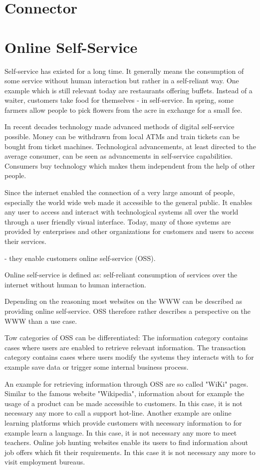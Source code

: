 \documentclass[
     12pt,         %
     a4paper,      %
     BCOR=10mm,version=first,     %
     DIV=14,version=first,        %
     ]{scrreprt}
\begin{document}
\section{Connector}

\section{Online Self-Service}
Self-service has existed for a long time. It generally means the consumption of some service without human interaction but rather in a self-reliant way. One example which is still relevant today are restaurants offering buffets. Instead of a waiter, customers take food for themselves - in self-service. In spring, some farmers allow people to pick flowers from the acre in exchange for a small fee.

In recent decades technology made advanced methods of digital self-service possible. Money can be withdrawn from local ATMs and train tickets can be bought from ticket machines. Technological advancements, at least directed to the average consumer, can be seen as advancements in self-service capabilities. Consumers buy technology which makes them independent from the help of other people. 

Since the internet enabled the connection of a very large amount of people, especially the world wide web made it accessible to the general public. It enables any user to access and interact with technological systems all over the world through a user friendly visual interface. Today, many of those systems are provided by enterprises and other organizations for customers and users to access their services. 

- they enable customers online self-service (OSS).

Online self-service is defined as: self-reliant consumption of services over the internet without human to human interaction.

Depending on the reasoning most websites on the WWW can be described as providing online self-service. OSS therefore rather describes a perspective on the WWW than a use case.

Tow categories of OSS can be differentiated: The information category contains cases where users are enabled to retrieve relevant information. The transaction category contains cases where users modify the systems they interacts with to for example save data or trigger some internal business process.

An example for retrieving information through OSS are so called "WiKi" pages. Similar to the famous website "Wikipedia", information about for example the usage of a product can be made accessible to customers. In this case, it is not necessary any more to call a support hot-line.
Another example are online learning platforms which provide customers with necessary information to for example learn a language. In this case, it is not necessary any more to meet teachers.
Online job hunting websites enable its users to find information about job offers which fit their requirements. In this case it is not necessary any more to visit employment bureaus.
\end{document}
